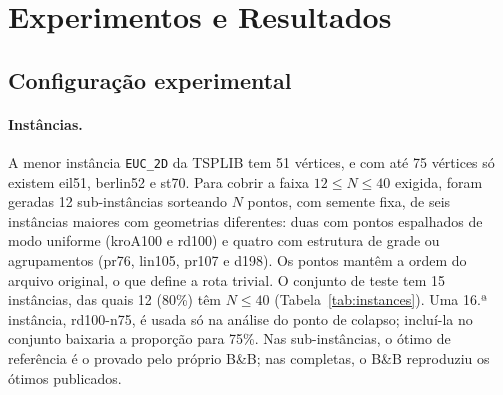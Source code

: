 \section{Experimentos e Resultados}\label{sec:experiments}

\subsection{Configuração experimental}\label{sec:setup}

\paragraph{Instâncias.} A menor instância \texttt{EUC\_2D} da TSPLIB tem 51 vértices, e
com até 75 vértices só existem eil51, berlin52 e st70. Para cobrir a faixa
$12 \leq N \leq 40$ exigida, foram geradas 12 sub-instâncias sorteando $N$ pontos, com
semente fixa, de seis instâncias maiores com geometrias diferentes: duas com pontos
espalhados de modo uniforme (kroA100 e rd100) e quatro com estrutura de grade ou
agrupamentos (pr76, lin105, pr107 e d198). Os pontos mantêm a ordem do arquivo original,
o que define a rota trivial. O conjunto de teste tem 15 instâncias, das quais 12 (80\%)
têm $N \leq 40$ (Tabela~\ref{tab:instances}). Uma 16.ª instância, rd100-n75, é usada só
na análise do ponto de colapso; incluí-la no conjunto baixaria a proporção para 75\%.
Nas sub-instâncias, o ótimo de referência é o provado pelo próprio B\&B; nas completas, o
B\&B reproduziu os ótimos publicados.


